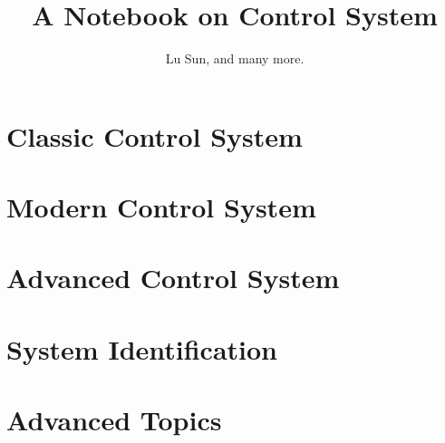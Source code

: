 



\makeindex



\frontmatter

\title{A Notebook on Control System}
\author{Lu Sun, and many more.}

\maketitle


\tableofcontents


\listoffigures
\listoftables

\mainmatter

\part{Classic Control System}





\part{Modern Control System}





\part{Advanced Control System}







\part{System Identification}







\part{Advanced Topics}










\printindex


